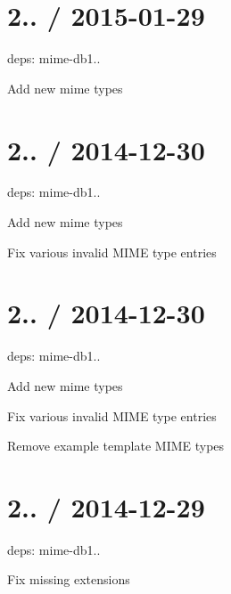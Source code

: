 \section*{2.. / 2015-\/01-\/29 }


\begin{DoxyItemize}
\item deps\+: mime-\/db1..
\begin{DoxyItemize}
\item Add new mime types
\end{DoxyItemize}
\end{DoxyItemize}

\section*{2.. / 2014-\/12-\/30 }


\begin{DoxyItemize}
\item deps\+: mime-\/db1..
\begin{DoxyItemize}
\item Add new mime types
\item Fix various invalid M\+I\+ME type entries
\end{DoxyItemize}
\end{DoxyItemize}

\section*{2.. / 2014-\/12-\/30 }


\begin{DoxyItemize}
\item deps\+: mime-\/db1..
\begin{DoxyItemize}
\item Add new mime types
\item Fix various invalid M\+I\+ME type entries
\item Remove example template M\+I\+ME types
\end{DoxyItemize}
\end{DoxyItemize}

\section*{2.. / 2014-\/12-\/29 }


\begin{DoxyItemize}
\item deps\+: mime-\/db1..
\begin{DoxyItemize}
\item Fix missing extensions
\end{DoxyItemize}
\end{DoxyItemize}

